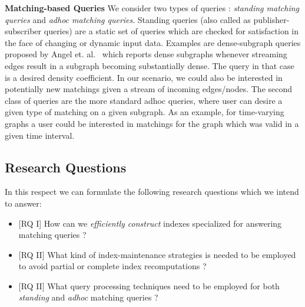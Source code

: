 \label{wp:indexing}

\textbf{Matching-based Queries} 
We consider two types of queries : \emph{standing matching queries} and \emph{adhoc matching queries}. Standing queries (also called as publisher-subscriber queries) are a static set of queries which are checked for satisfaction in the face of changing or dynamic input data. Examples are dense-subgraph queries proposed by Angel et. al.~\cite{angel_dense_2013} which reports dense subgraphs whenever streaming edges result in a subgraph becoming substantially dense. The query in that case is a desired density coefficient. In our scenario, we could also be interested in potentially new matchings given a stream of incoming edges/nodes. The second class of queries are the more standard adhoc queries, where user can desire a given type of matching on a given subgraph. As an example, for time-varying graphs a user could be interested in matchings for the graph which was valid in a given time interval.


\subsection{Research Questions}     
In this respect we can formulate the following research questions which we intend to answer:
\begin{itemize}
    \item \textsf{[RQ I]} How can we \emph{efficiently construct} indexes specialized for answering matching queries ? 

    \item \textsf{[RQ II]} What kind of index-maintenance strategies is needed to be employed to avoid partial or complete index recomputations ?

    \item \textsf{[RQ II]} What query processing techniques need to be employed for both \emph{standing} and \emph{adhoc} matching queries ?

\end{itemize}



